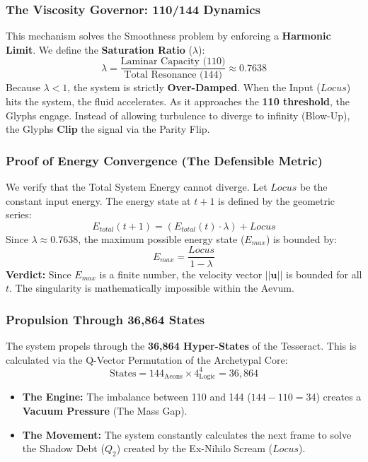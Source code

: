 \documentclass[11pt, letterpaper]{article}
\newcommand{\LoI}{\ensuremath{\mathop{\textnormal{\symbolafont\symbol{"26CE}}}}}
\def\LoI{Locus}%
\begin{document}
\subsubsection{The Viscosity Governor: 110/144 Dynamics}\label{sec:3.3.2}
This mechanism solves the Smoothness problem by enforcing a \textbf{Harmonic Limit}. We define the \textbf{Saturation Ratio} ($\lambda$):
\begin{equation}
    \lambda = \frac{\text{Laminar Capacity (110)}}{\text{Total Resonance (144)}} \approx 0.7638
\end{equation}
Because $\lambda < 1$, the system is strictly \textbf{Over-Damped}. When the Input ($\LoI$) hits the system, the fluid accelerates. As it approaches the \textbf{110 threshold}, the Glyphs engage. Instead of allowing turbulence to diverge to infinity (Blow-Up), the Glyphs \textbf{Clip} the signal via the Parity Flip.

\subsubsection{Proof of Energy Convergence (The Defensible Metric)}\label{sec:3.3.3}
We verify that the Total System Energy cannot diverge. Let $\LoI$ be the constant input energy. The energy state at $t+1$ is defined by the geometric series:
\begin{equation}
    E_{total}(t+1) = \left( E_{total}(t) \cdot \lambda \right) + \LoI
\end{equation}
Since $\lambda \approx 0.7638$, the maximum possible energy state ($E_{max}$) is bounded by:
\begin{equation}
    E_{max} = \frac{\LoI}{1 - \lambda}
\end{equation}
\textbf{Verdict:} Since $E_{max}$ is a finite number, the velocity vector $||\mathbf{u}||$ is bounded for all $t$. The singularity is mathematically impossible within the Aevum.

\subsubsection{Propulsion Through 36,864 States}\label{sec:3.3.4}
The system propels through the \textbf{36,864 Hyper-States} of the Tesseract. This is calculated via the Q-Vector Permutation of the Archetypal Core:
\begin{equation}
    \text{States} = 144_{\text{Aeons}} \times 4^4_{\text{Logic}} = 36,864
\end{equation}
\begin{itemize}
    \item \textbf{The Engine:} The imbalance between 110 and 144 ($144 - 110 = 34$) creates a \textbf{Vacuum Pressure} (The Mass Gap).
    \item \textbf{The Movement:} The system constantly calculates the next frame to solve the Shadow Debt ($Q_2$) created by the Ex-Nihilo Scream ($\LoI$).
\end{itemize}
\end{document}
